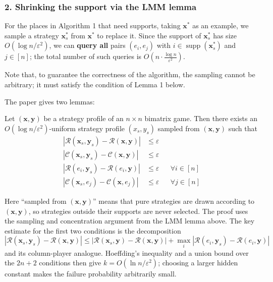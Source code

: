 \subsubsection*{2. Shrinking the support via the LMM lemma}

For the places in Algorithm 1 that need supports, taking $\mathbf{x}^*$ as an example, we sample a strategy $\mathbf{x}_s^*$ from $\mathbf{x}^*$ to replace it. Since the support of $\mathbf{x}_s^*$ has size $O(\log n / \varepsilon^2)$, we can \textbf{query all} pairs $(e_i, e_j)$ with $i \in \operatorname{supp}(\mathbf{x}_s^*)$ and $j \in [n]$; the total number of such queries is $O(n \cdot \frac{\log n}{\varepsilon^2})$.

Note that, to guarantee the correctness of the algorithm, the sampling cannot be arbitrary; it must satisfy the condition of Lemma 1 below.

The paper gives two lemmas:

\begin{lemma}
  \label{lem:small-supp-approx}
  Let $(\mathbf{x}, \mathbf{y})$ be a strategy profile of an $n \times n$ bimatrix game. Then there exists an $O(\log n / \varepsilon^2)$-uniform strategy profile $(x_s, y_s)$ sampled from $(\mathbf{x}, \mathbf{y})$ such that
  \begin{align*}
    |\mathcal{R}(\mathbf{x}_s, \mathbf{y}_s) - \mathcal{R}(\mathbf{x}, \mathbf{y})| & \le \varepsilon                        \\
    |\mathcal{C}(\mathbf{x}_s, \mathbf{y}_s) - \mathcal{C}(\mathbf{x}, \mathbf{y})| & \le \varepsilon                        \\
    |\mathcal{R}(e_i, \mathbf{y}_s) - \mathcal{R}(e_i, \mathbf{y})|                 & \le \varepsilon &  & \forall i \in [n] \\
    |\mathcal{C}(\mathbf{x}_s, e_j) - \mathcal{C}(\mathbf{x}, e_j)|                 & \le \varepsilon &  & \forall j \in [n]
  \end{align*}
\end{lemma}

Here ``sampled from $(\mathbf{x}, \mathbf{y})$'' means that pure strategies are drawn according to $(\mathbf{x}, \mathbf{y})$, so strategies outside their supports are never selected. The proof uses the sampling and concentration argument from the LMM lemma above. The key estimate for the first two conditions is the decomposition
\[
  |\mathcal{R}(\mathbf{x}_s, \mathbf{y}_s) - \mathcal{R}(\mathbf{x}, \mathbf{y})| \le |\mathcal{R}(\mathbf{x}_s, \mathbf{y}) - \mathcal{R}(\mathbf{x}, \mathbf{y})| + \max_{i} |\mathcal{R}(e_i, \mathbf{y}_s) - \mathcal{R}(e_i, \mathbf{y})|
\]
and its column-player analogue. Hoeffding's inequality and a union bound over the $2n+2$ conditions then give $k=O(\ln n/\varepsilon^2)$; choosing a larger hidden constant makes the failure probability arbitrarily small.


